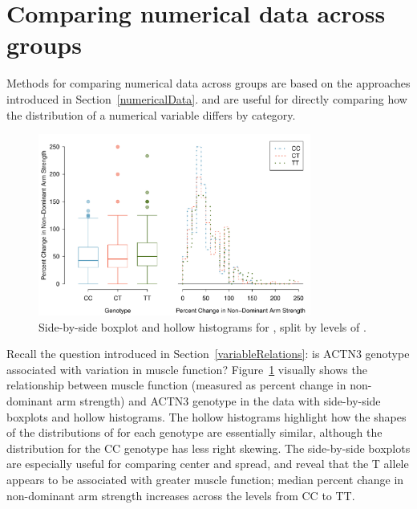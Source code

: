 \section{Comparing numerical data across groups}
\label{relationshipsBetweenTwoVariables}


Methods for comparing numerical data across groups are based on the approaches introduced in Section~\ref{numericalData}.  and  are useful for directly comparing how the distribution of a numerical variable differs by category. 


\begin{figure}[h]
	\centering
	\includegraphics[width=0.8\textwidth]{ch_01a_intro_to_data_oi_biostat/figures/famussGenoMuscFunc/famussGenoMuscFunc}
	\caption{Side-by-side boxplot and hollow histograms for , split by levels of .}
	\label{famussGenoMuscFunc}
\end{figure}

Recall the question introduced in Section~\ref{variableRelations}: is ACTN3 genotype associated with variation in muscle function? Figure~\ref{famussGenoMuscFunc} visually shows the relationship between muscle function (measured as percent change in non-dominant arm strength) and ACTN3 genotype in the  data with side-by-side boxplots and hollow histograms. The hollow histograms highlight how the shapes of the distributions of  for each genotype are essentially similar, although the distribution for the CC genotype has less right skewing. The side-by-side boxplots are especially useful for comparing center and spread, and reveal that the T allele appears to be associated with greater muscle function; median percent change in non-dominant arm strength increases across the levels from CC to TT. 

